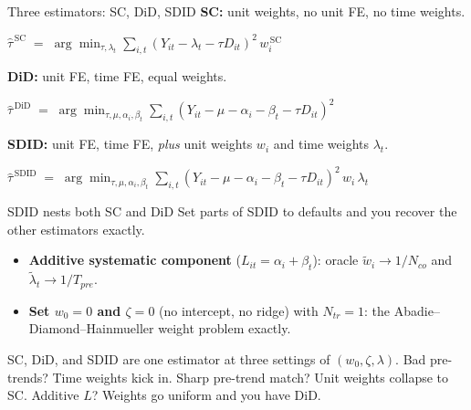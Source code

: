 \documentclass[aspectratio=169,11pt]{beamer}
\begin{document}
\begin{frame}{Three estimators: SC, DiD, SDID}
\vspace{0.4em}
\textbf{SC:} \;unit weights, no unit FE, no time weights.
\vspace{0.2em}
\begin{center}\small
$\widehat{\tau}^{\,\text{SC}} \;=\; \displaystyle\arg\min_{\tau, \lambda_t}\sum_{i,t} (Y_{it} - \lambda_t - \tau D_{it})^2 \,w_i^{\,\text{SC}}$
\end{center}

\vspace{0.6em}
\textbf{DiD:} \;unit FE, time FE, equal weights.
\vspace{0.2em}
\begin{center}\small
$\widehat{\tau}^{\,\text{DiD}} \;=\; \displaystyle\arg\min_{\tau, \mu, \alpha_i, \beta_t}\sum_{i,t} (Y_{it} - \mu - \alpha_i - \beta_t - \tau D_{it})^2$
\end{center}

\vspace{0.6em}
\textbf{SDID:} \;unit FE, time FE, \textit{plus} unit weights $w_i$ and time weights $\lambda_t$.
\vspace{0.2em}
\begin{center}\small
$\widehat{\tau}^{\,\text{SDID}} \;=\; \displaystyle\arg\min_{\tau, \mu, \alpha_i, \beta_t}\sum_{i,t} (Y_{it} - \mu - \alpha_i - \beta_t - \tau D_{it})^2 \,w_i \,\lambda_t$
\end{center}

\vspace{0.4em}
\end{frame}

\begin{frame}{SDID nests both SC and DiD}
\footnotesize
Set parts of SDID to defaults and you recover the other estimators exactly.

\vspace{0.5em}
\begin{itemize}\setlength\itemsep{4pt}
  \item \textbf{Additive systematic component} ($L_{it} = \alpha_i + \beta_t$): \;oracle $\widetilde{w}_i \to 1/N_{co}$ and $\widetilde{\lambda}_t \to 1/T_{pre}$. \;
  \item \textbf{Set $w_0 = 0$ and $\zeta = 0$} (no intercept, no ridge) with $N_{tr}=1$: \;the Abadie--Diamond--Hainmueller weight problem exactly. \;
\end{itemize}

\vspace{0.6em}
 \;SC, DiD, and SDID are one estimator at three settings of $(w_0, \zeta, \lambda)$. \;Bad pre-trends? Time weights kick in. Sharp pre-trend match? Unit weights collapse to SC. Additive $L$? Weights go uniform and you have DiD.
\end{frame}
\end{document}
